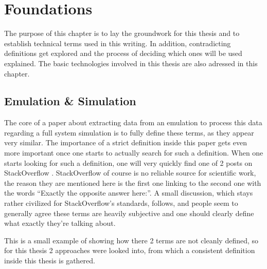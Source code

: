 \chapter{Foundations}
The purpose of this chapter is to lay the groundwork for this thesis
and to establish technical terms used in this writing.
In addition, contradicting definitions get explored
and the process of deciding which ones will be used explained.
The basic technologies involved in this thesis are also adressed in this chapter.

\section{Emulation \& Simulation}
The core of a paper about extracting data from an emulation
to process this data regarding a full system simulation is to fully define these terms,
as they appear very similar.
The importance of a strict definition inside this paper gets even more important
once one starts to actually search for such a definition.
When one starts looking for such a definition,
one will very quickly find one of 2 posts on StackOverflow \cite{SO_link}\cite{SO}.
StackOverflow of course is no reliable source for scientific work,
the reason they are mentioned here is the first one linking to the second one
with the words \enquote{Exactly the opposite answer here:}\cite{SO_link}.
A small discussion, which stays rather civilized for StackOverflow's standards, follows,
and people seem to generally agree these terms are heavily subjective and one should clearly define what exactly they're talking about.

This is a small example of showing how there 2 terms are not cleanly defined,
so for this thesis 2 approaches were looked into,
from which a consistent definition inside this thesis is gathered.

